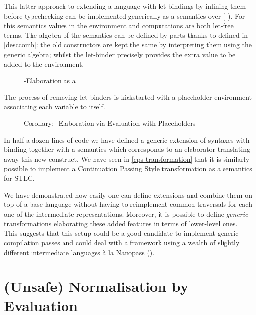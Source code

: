 This latter approach to extending a language  with let bindings
by inlining them before typechecking can be implemented generically as
a semantics over (  ). For this semantics values
in the environment and computations are both let-free terms. The algebra
of the semantics can be defined by parts thanks to  defined in
\cref{desccomb}: the old constructors are kept the same by interpreting
them using the generic  algebra;
whilst the let-binder precisely provides the extra value to be added to the
environment.

\begin{figure}[h]
\caption{-Elaboration as a }
\end{figure}

The process of removing let binders is kickstarted with a placeholder
environment associating each variable to itself.

\begin{figure}[h]
\caption{Corollary: -Elaboration via Evaluation with Placeholders}
\end{figure}

In half a dozen lines of code we have defined a generic extension of syntaxes with
binding together with a semantics which corresponds to an elaborator translating
away this new construct. We have seen in \cref{cps-transformation} that it is
similarly possible to implement a Continuation Passing Style transformation as
a semantics for STLC.

We have demonstrated how easily one can define extensions and combine them on top
of a base language without having to reimplement common traversals for each one
of the intermediate representations. Moreover, it is possible to define
\emph{generic} transformations elaborating these added features in terms of
lower-level ones. This suggests that this setup could be a good candidate to
implement generic compilation passes and could deal with a framework using a
wealth of slightly different intermediate languages à la Nanopass (\cite{Keep:2013:NFC:2544174.2500618}).


\section{(Unsafe) Normalisation by Evaluation}\label{section:unsafenbyeval}

